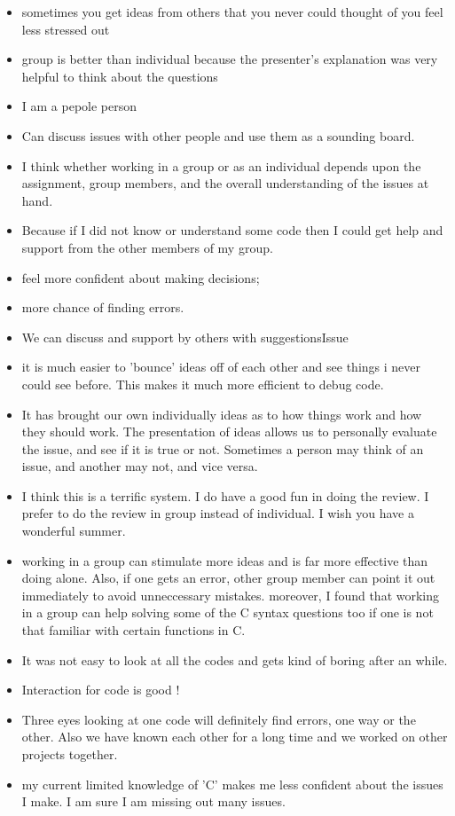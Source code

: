 \begin{enumerate}
\begin{itemize}
\item sometimes you get ideas from others that you never could thought of
you feel less stressed out


\item group is better than individual
because the presenter's explanation was very helpful to think about
the questions



\item I am a pepole person
\item Can discuss issues with other people and use them as a sounding board.

\item I think whether working in a group or as an individual depends upon
the assignment, group members, and the overall understanding of the
issues at hand.
\item Because if I did not know or understand some code then I could get
help and support from the other members of my group.
\item feel more confident about making decisions;

\item more chance of finding errors.
\item We can discuss and support by others with suggestionsIssue
\item it is much easier to 'bounce' ideas off of each other and see things
i never could see before. This makes it much more efficient to debug code.

\item It has brought our own individually ideas as to how things work and
how they should work.  The presentation of ideas allows us to
personally evaluate the issue, and see if it is true or not.
Sometimes a person may think of an issue, and another may not, and
vice versa.
\item I think this is a terrific system.  I do have a good fun in doing
the review.  I prefer to do the review in group instead of individual.
I wish you have a wonderful summer.
\item working in a group can stimulate more ideas and is far more effective
than doing alone. Also, if one gets an error, other group member can
point it out immediately to avoid unneccessary mistakes. moreover, I
found that working in a group can help solving some of the C syntax
questions too if one is not that familiar with certain functions in C.


\item It was not easy to look at all the codes and gets kind of boring after
an while.
\item Interaction for code is good !
\item Three eyes looking at one code will definitely
find errors, one way or the other.  Also we have
known each other for a long time and we worked
on other projects together.
\item my current limited knowledge of 'C' makes me less confident about the
issues I make.  I am sure I am missing out many issues.


\end{itemize}
\end{enumerate}
